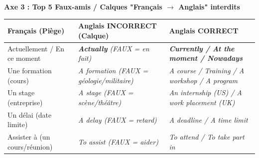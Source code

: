 \documentclass[11pt]{article}
\newcommand{\eng}[1]{\ifmmode\text{\textit{#1}}\else\begingroup\selectlanguage{english}\itshape #1\endgroup\fi}
\begin{document}
\begin{methode}
\textbf{Axe 3 : Top 5 Faux-amis / Calques "Français $\to$ Anglais" interdits}
\begin{center}
\begin{tabularx}{\linewidth}{|X|X|X|}
\hline
\rowcolor{poporangeL} \textbf{Français (Piège)} & \textbf{Anglais INCORRECT (Calque)} & \textbf{Anglais CORRECT} \\
\hline
Actuellement / En ce moment & \eng{\textbf{Actually}} (FAUX = en fait) & \eng{\textbf{Currently / At the moment / Nowadays}} \\
Une formation (cours) & \eng{A formation} (FAUX = géologie/militaire) & \eng{A course / Training / A workshop / A program} \\
Un stage (entreprise) & \eng{A stage} (FAUX = scène/théâtre) & \eng{An internship (US) / A work placement (UK)} \\
Un délai (date limite) & \eng{A delay} (FAUX = retard) & \eng{A deadline / A time limit} \\
Assister à (un cours/réunion) & \eng{To assist} (FAUX = aider) & \eng{To attend / To take part in} \\
\hline
\end{tabularx}
\end{center}
\end{methode}
\end{document}
